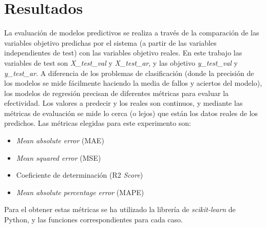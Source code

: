\documentclass[12pt,a4paper,Spanish]{article}
\begin{document}
\newpage
\section{Resultados}\label{resultados}
La evaluación de modelos predictivos se realiza a través de la comparación de las variables objetivo predichas por el sistema (a partir de las variables independientes de test) con las variables objetivo reales. En este trabajo las variables de test son \textit{X\_test\_val} y \textit{X\_test\_ar}, y las objetivo \textit{y\_test\_val} y \textit{y\_test\_ar}.
\newline
A diferencia de los problemas de clasificación (donde la precisión de los modelos se mide fácilmente  haciendo la media de fallos y aciertos del modelo), los modelos de regresión precisan de diferentes métricas para evaluar la efectividad. Los valores a predecir y los reales son continuos, y mediante las métricas de evaluación se mide lo cerca (o lejos) que están los datos reales de los predichos.
Las métricas elegidas para este experimento son:
\begin{itemize}
	\item \textit{Mean absolute error} (MAE)
	\item \textit{Mean squared error} (MSE)
	\item Coeficiente de determinación (R2 \textit{Score})
	\item \textit{Mean absolute percentage error} (MAPE)
\end{itemize}
Para el obtener estas métricas se ha utilizado la librería de \textit{scikit-learn} de Python, y las funciones correspondientes para cada caso.
\end{document}
